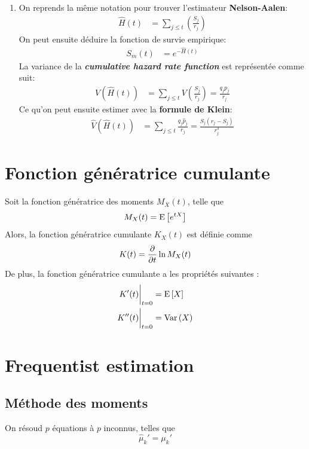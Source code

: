 \documentclass[french, landscape]{article}
\begin{document}
\begin{multicols*}{3}

\begin{enumerate}
	\item[] On reprends la même notation pour trouver l'estimateur \textbf{Nelson-Aalen}:
	\begin{align*}
		\widehat{H}(t) &= \sum_{j \le t} \left( \frac{S_{j}}{r_{j}}\right)
	\end{align*}
	On peut ensuite déduire la fonction de survie empirique:
	\begin{align*}
		S_m(t) &= e^{-\widehat{H}(t)}
	\end{align*}	
	La variance de la \textbf{\textit{cumulative hazard rate function}} est représentée comme suit:
	\begin{align*}	
		V(\widehat{H}(t)) &= \sum_{j \le t} V\left( \frac{S_j}{r_j} \right) = \frac{q_j p_j}{r_j}
	\end{align*}
	Ce qu'on peut ensuite estimer avec la \textbf{formule de Klein}:
	\begin{align*}	
		\widehat{V}(\widehat{H}(t)) &= \sum_{j \le t} \frac{\widehat{q}_j \widehat{p}_j}{r_j} = \frac{S_j (r_j - S_j)}{r_j^3}  
	\end{align*}
\end{enumerate}


\section{Fonction génératrice cumulante}
Soit la fonction génératrice des moments $M_X(t)$, telle que
\[M_X(t) = \mathrm{E} \left[ e^{tX} \right]\]
Alors, la fonction génératrice cumulante $K_X(t)$ est définie comme
\[K(t) = \frac{\partial}{\partial t} \ln M_X(t)\]
De plus, la fonction génératrice cumulante a les propriétés suivantes : 
\begin{align*}
K'(t) \biggr \rvert_{t = 0} & =   \mathrm{E} \left[ X \right] \\
K''(t) \biggr \rvert_{t=0} & = \mathrm{Var} \left( X \right) \\
\end{align*}


\section{Frequentist estimation}
\subsection*{Méthode des moments}
On résoud $p$ équations à $p$ inconnus, telles que
\[\hat{\mu}_k' = \mu_k'\]


\end{multicols*}
\end{document}
